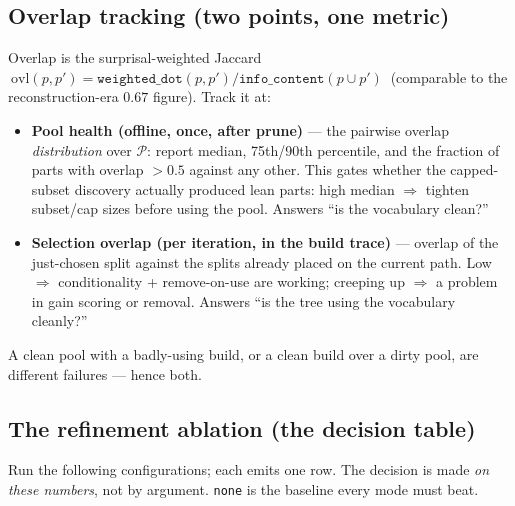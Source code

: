 \documentclass[11pt]{article}
\newcommand{\code}[1]{\texttt{#1}}
\begin{document}
\subsection{Overlap tracking (two points, one metric)}
Overlap is the surprisal-weighted Jaccard $\ \text{ovl}(p,p')=\code{weighted\_dot}(p,p')/\code{info\_content}(p\cup p')\ $ (comparable to the reconstruction-era $0.67$ figure). Track it at:
\begin{itemize}[nosep]
\item \textbf{Pool health (offline, once, after prune)} --- the pairwise overlap \emph{distribution} over $\mathcal{P}$: report median, 75th/90th percentile, and the fraction of parts with overlap $>0.5$ against any other. This gates whether the capped-subset discovery actually produced lean parts: high median $\Rightarrow$ tighten subset/cap sizes before using the pool. Answers ``is the vocabulary clean?''
\item \textbf{Selection overlap (per iteration, in the build trace)} --- overlap of the just-chosen split against the splits already placed on the current path. Low $\Rightarrow$ conditionality + remove-on-use are working; creeping up $\Rightarrow$ a problem in gain scoring or removal. Answers ``is the tree using the vocabulary cleanly?''
\end{itemize}
A clean pool with a badly-using build, or a clean build over a dirty pool, are different failures --- hence both.


\subsection{The refinement ablation (the decision table)}
Run the following configurations; each emits one row. The decision is made \emph{on these numbers}, not by argument. \code{none} is the baseline every mode must beat.
\end{document}
